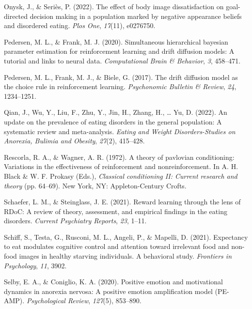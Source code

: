 \documentclass[
  man,floatsintext]{apa6}
\newlength{\cslhangindent}
\newlength{\cslentryspacingunit} %
\newenvironment{CSLReferences}[2] %
 {%
  \setlength{\parindent}{0pt}
  \ifodd #1
  \let\oldpar\par
  \def\par{\hangindent=\cslhangindent\oldpar}
  \fi
  \setlength{\parskip}{#2\cslentryspacingunit}
 }%
 {}
\begin{document}
\begin{CSLReferences}{1}{0}
\leavevmode{}%
Onysk, J., \& Seriès, P. (2022). The effect of body image dissatisfaction on goal-directed decision making in a population marked by negative appearance beliefs and disordered eating. \emph{Plos One}, \emph{17}(11), e0276750.

\leavevmode{}%
Pedersen, M. L., \& Frank, M. J. (2020). Simultaneous hierarchical bayesian parameter estimation for reinforcement learning and drift diffusion models: A tutorial and links to neural data. \emph{Computational Brain \& Behavior}, \emph{3}, 458--471.

\leavevmode{}%
Pedersen, M. L., Frank, M. J., \& Biele, G. (2017). The drift diffusion model as the choice rule in reinforcement learning. \emph{Psychonomic Bulletin \& Review}, \emph{24}, 1234--1251.

\leavevmode{}%
Qian, J., Wu, Y., Liu, F., Zhu, Y., Jin, H., Zhang, H., \ldots{} Yu, D. (2022). An update on the prevalence of eating disorders in the general population: A systematic review and meta-analysis. \emph{Eating and Weight Disorders-Studies on Anorexia, Bulimia and Obesity}, \emph{27}(2), 415--428.

\leavevmode{}%
Rescorla, R. A., \& Wagner, A. R. (1972). A theory of pavlovian conditioning: Variations in the effectiveness of reinforcement and nonreinforcement. In A. H. Black \& W. F. Prokasy (Eds.), \emph{Classical conditioning II: Current research and theory} (pp. 64--69). New York, NY: Appleton-Century Crofts.

\leavevmode{}%
Schaefer, L. M., \& Steinglass, J. E. (2021). Reward learning through the lens of RDoC: A review of theory, assessment, and empirical findings in the eating disorders. \emph{Current Psychiatry Reports}, \emph{23}, 1--11.

\leavevmode{}%
Schiff, S., Testa, G., Rusconi, M. L., Angeli, P., \& Mapelli, D. (2021). Expectancy to eat modulates cognitive control and attention toward irrelevant food and non-food images in healthy starving individuals. A behavioral study. \emph{Frontiers in Psychology}, \emph{11}, 3902.

\leavevmode{}%
Selby, E. A., \& Coniglio, K. A. (2020). Positive emotion and motivational dynamics in anorexia nervosa: A positive emotion amplification model (PE-AMP). \emph{Psychological Review}, \emph{127}(5), 853--890.


\end{CSLReferences}
\end{document}
